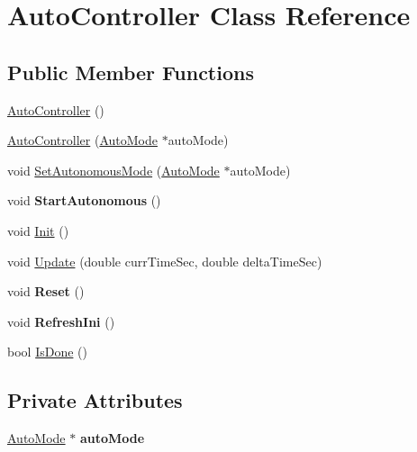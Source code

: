 \hypertarget{class_auto_controller}{}\section{Auto\+Controller Class Reference}
\label{class_auto_controller}
\subsection*{Public Member Functions}
\begin{DoxyCompactItemize}
\item 
\hyperlink{class_auto_controller_aaa1564aeb5d8577d7d8e973daedfd3ae}{Auto\+Controller} ()
\item 
\hyperlink{class_auto_controller_a8fddf9163735e6fc44572e9f59116084}{Auto\+Controller} (\hyperlink{class_auto_mode}{Auto\+Mode} $\ast$auto\+Mode)
\item 
void \hyperlink{class_auto_controller_a8bb1c3117bf7e528c73e4d3edd49d0ba}{Set\+Autonomous\+Mode} (\hyperlink{class_auto_mode}{Auto\+Mode} $\ast$auto\+Mode)
\item 
\mbox{\label{class_auto_controller_a86c89bedf59d9746d729dead3368460f}} 
void {\bfseries Start\+Autonomous} ()
\item 
void \hyperlink{class_auto_controller_a8b7b16e449078e1818b4bc302f97da07}{Init} ()
\item 
void \hyperlink{class_auto_controller_a733fa15c9d374adcb458b0d6f0890910}{Update} (double curr\+Time\+Sec, double delta\+Time\+Sec)
\item 
\mbox{\label{class_auto_controller_a58a880e7fdce5953714c3a1d70f49eac}} 
void {\bfseries Reset} ()
\item 
\mbox{\label{class_auto_controller_a6e3477125ee0e9f2658d88b3d856cd88}} 
void {\bfseries Refresh\+Ini} ()
\item 
bool \hyperlink{class_auto_controller_a692f9395f78cb214ed7c410505686334}{Is\+Done} ()
\end{DoxyCompactItemize}
\subsection*{Private Attributes}
\begin{DoxyCompactItemize}
\item 
\mbox{\label{class_auto_controller_a85f5b014c905fe3ac77e3024ad1ebe56}} 
\hyperlink{class_auto_mode}{Auto\+Mode} $\ast$ {\bfseries auto\+Mode}
\end{DoxyCompactItemize}


